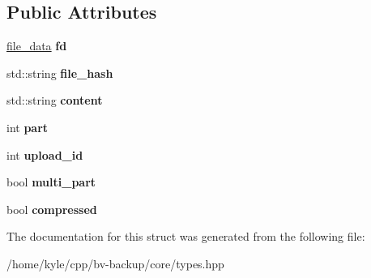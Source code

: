 \subsection*{Public Attributes}
\begin{DoxyCompactItemize}
\item 
\mbox{\label{struct_backup_1_1_types_1_1http__upload__file_a83e19aec410d33300bfb42f66f4ba402}} 
\hyperlink{struct_backup_1_1_types_1_1file__data}{file\+\_\+data} {\bfseries fd}
\item 
\mbox{\label{struct_backup_1_1_types_1_1http__upload__file_a0013011e56e720c81c8c3afb21a58d3f}} 
std\+::string {\bfseries file\+\_\+hash}
\item 
\mbox{\label{struct_backup_1_1_types_1_1http__upload__file_a6ba75f5180113a22379cf998ce266339}} 
std\+::string {\bfseries content}
\item 
\mbox{\label{struct_backup_1_1_types_1_1http__upload__file_a73f312664509d364370a0072b9d77614}} 
int {\bfseries part}
\item 
\mbox{\label{struct_backup_1_1_types_1_1http__upload__file_ac5aa0823717adc9ca2510b0996a93484}} 
int {\bfseries upload\+\_\+id}
\item 
\mbox{\label{struct_backup_1_1_types_1_1http__upload__file_ae2a0eb51f4e154ab6b1203e71aff4b25}} 
bool {\bfseries multi\+\_\+part}
\item 
\mbox{\label{struct_backup_1_1_types_1_1http__upload__file_acea6776494bf00a3be9cc7535b0204d4}} 
bool {\bfseries compressed}
\end{DoxyCompactItemize}


The documentation for this struct was generated from the following file\+:\begin{DoxyCompactItemize}
\item 
/home/kyle/cpp/bv-\/backup/core/types.\+hpp\end{DoxyCompactItemize}
